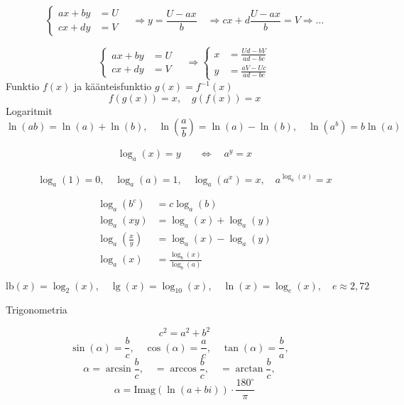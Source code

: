\documentclass[12pt]{article}
\begin{document}
$$
\begin{cases}
ax+by&=U\\
cx+dy&=V
\end{cases}\quad\Rightarrow
y=\frac{U-ax}{b}\quad\Rightarrow
cx+d\frac{U-ax}{b}=V\Rightarrow\ldots
$$

$$
\begin{cases}
ax+by&=U\\
cx+dy&=V
\end{cases}\quad\Rightarrow
\begin{cases}
x&=\frac{Ud-bV}{ad-bc}\\
y&=\frac{aV-Uc}{ad-bc}
\end{cases}
$$
Funktio $f(x)$ ja käänteisfunktio $g(x)=f^{-1}(x)$
$$
f(g(x))=x,\quad
g(f(x))=x
$$
Logaritmit
$$
\ln(ab)=\ln(a)+\ln(b),\quad
\ln(\frac{a}{b})=\ln(a)-\ln(b),\quad
\ln(a^b)=b\ln(a)
$$


\begin{equation*}
\begin{split}
\log_a(x)=y\quad&\Leftrightarrow\quad a^y=x
\end{split}
\end{equation*}


$$
\log_a(1)=0,\quad
\log_a(a)=1,\quad
\log_a(a^x)=x,\quad
a^{\log_a(x)}=x
$$

\begin{equation*}
\begin{split}
\log_a(b^c)&=c\log_a(b)\\
\log_a(xy)&=\log_a(x)+\log_a(y)\\
\log_a\left(\frac{x}{y}\right)
&=\log_a(x)-\log_a(y)\\
\log_a(x)&=\frac{\log_b(x)}{\log_b(a)}
\end{split}
\end{equation*}

$$
\textrm{lb}(x)=\log_2(x),\quad
\lg(x)=\log_{10}(x),\quad
\ln(x)=\log_e(x),\quad
e\approx 2,72
$$

\begin{multicols}{2}

Trigonometria

$$
c^2=a^2+b^2
$$
$$
\sin(\alpha)=\frac{b}{c},\quad
\cos(\alpha)=\frac{a}{c},\quad
\tan(\alpha)=\frac{b}{a},\quad
$$
$$
\alpha=\arcsin\frac{b}{c},\quad
=\arccos\frac{b}{c},\quad
=\arctan\frac{b}{c},\quad
$$
$$
\alpha=\textrm{Imag}(\ln(a+bi))\cdot\frac{180^\circ}{\pi}
$$
\end{multicols}
\end{document}
